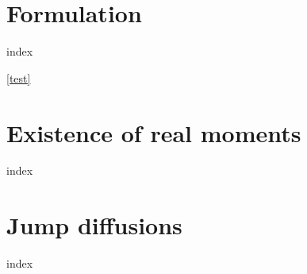 \label{affine-processes:introduction}


\section{Formulation}
\label{affine-processes:formulation}
{index}

\ref{test}

\section{Existence of real moments}
\label{affine-processes:existence}
{index}

\section{Jump diffusions}
\label{affine-processes:jump-diffusions}
{index}
